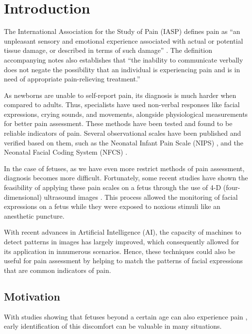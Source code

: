 \chapter{Introduction}

The International Association for the Study of Pain (IASP) defines pain as ``an unpleasant sensory and emotional experience associated with actual or potential tissue damage, or described in terms of such damage'' \citep{merskey1994classification}. The definition accompanying notes also establishes that ``the inability to communicate verbally does not negate the possibility that an individual is experiencing pain and is in need of appropriate pain-relieving treatment.''

As newborns are unable to self-report pain, its diagnosis is much harder when compared to adults. Thus, specialists have used non-verbal responses like facial expressions, crying sounds, and movements, alongside physiological measurements for better pain assessment. These methods have been tested and found to be reliable indicators of pain. Several observational scales have been published and verified based on them, such as the Neonatal Infant Pain Scale (NIPS) \citep{Lawrence1993}, and the Neonatal Facial Coding System (NFCS) \citep{Grunau1998}.

In the case of fetuses, as we have even more restrict methods of pain assessment, diagnosis becomes more difficult. Fortunately, some recent studies have shown the feasibility of applying these pain scales on a fetus through the use of 4-D (four-dimensional) ultrasound images \citep{bernardes2018feasibility}. This process allowed the monitoring of facial expressions on a fetus while they were exposed to noxious stimuli like an anesthetic puncture.

With recent advances in Artificial Intelligence (AI), the capacity of machines to detect patterns in images has largely improved, which consequently allowed for its application in innumerous scenarios. Hence, these techniques could also be useful for pain assessment by helping to match the patterns of facial expressions that are common indicators of pain.

\section{Motivation}

With studies showing that fetuses beyond a certain age can also experience pain \citep{Derbyshire2006, Derbyshire2020}, early identification of this discomfort can be valuable in many situations. 

